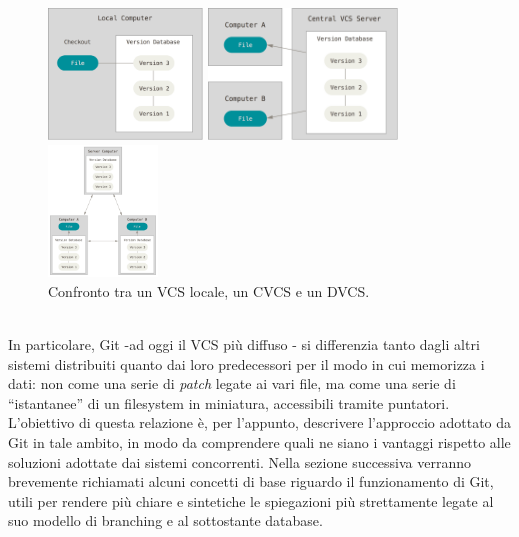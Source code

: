 \documentclass[12pt]{article}
\def\quote#1{``#1''}
\begin{document}
\begin{figure}[h]
	\centering
		\begin{minipage}{4cm}
			\includegraphics[height=3.5cm]{local.png}
		\end{minipage}
		\qquad
		\begin{minipage}{4cm}
			 \includegraphics[height=3.5cm]{centralized.png}
		\end{minipage}
		\qquad
		\qquad
		\begin{minipage}{4cm}
			\includegraphics[height=3.5cm]{distributed.png}
		\end{minipage}
	\caption{Confronto tra un VCS locale, un CVCS e un DVCS.}
\end{figure}
\\In particolare, Git -ad oggi il VCS più diffuso \cite{openhub}- si differenzia tanto dagli altri sistemi distribuiti quanto dai loro predecessori per il modo in cui memorizza i dati: non come una serie di \textit{patch} legate ai vari file, ma come una serie di \quote{istantanee} di un filesystem in miniatura, accessibili tramite puntatori.
L'obiettivo di questa relazione è, per l'appunto, descrivere l'approccio adottato da Git in tale ambito, in modo da comprendere quali ne siano i vantaggi rispetto alle soluzioni adottate dai sistemi concorrenti.
Nella sezione successiva verranno brevemente richiamati alcuni concetti di base riguardo il funzionamento di Git, utili per rendere più chiare e sintetiche le spiegazioni più strettamente legate al suo modello di branching e al sottostante database.
\end{document}
